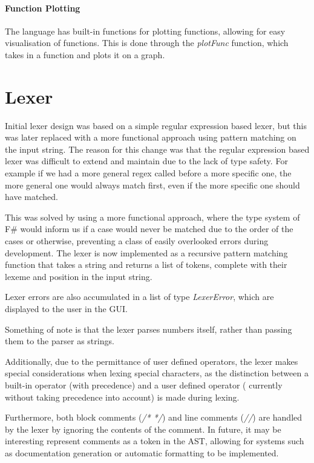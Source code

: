 \paragraph{Function Plotting} The language has built-in functions for plotting functions, allowing for easy
visualisation of functions.
This is done through the \textit{plotFunc} function, which takes in a function and plots it on a graph.

\section{Lexer}\label{sec:lexer}

Initial lexer design was based on a simple regular expression based lexer, but this was later replaced with a more
functional approach using pattern matching on the input string.
The reason for this change was that the regular expression based lexer was difficult to extend and maintain due to 
the lack of type safety.
For example if we had a more general regex called before a more specific one, the more general one would always match
first, even if the more specific one should have matched.

This was solved by using a more functional approach, where the type system of F\# would inform us if a case would 
never be matched due to the order of the cases or otherwise, preventing a class of easily overlooked errors during development.
The lexer is now implemented as a recursive pattern matching function that takes a string and returns a list of 
tokens, complete with their lexeme and position in the input string.

Lexer errors are also accumulated in a list of type \textit{LexerError}, which are displayed to the user in the GUI\@.

Something of note is that the lexer parses numbers itself, rather than passing them to the parser as strings.

Additionally, due to the permittance of user defined operators, the lexer makes special considerations when lexing 
special characters, as the distinction between a built-in operator (with precedence) and a user defined operator (
currently without taking precedence into account) is made during lexing.

Furthermore, both block comments (\textit{/* */}) and line comments (\textit{//}) are handled by the lexer by ignoring
the contents of the comment.
In future, it may be interesting represent comments as a token in the AST, allowing for systems such as documentation
generation or automatic formatting to be implemented.

